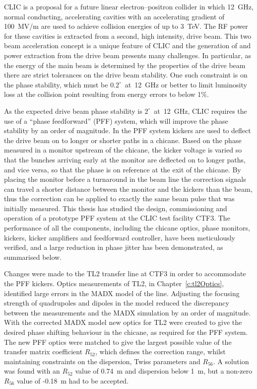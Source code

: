 

CLIC is a proposal for a future linear electron--positron collider in which 12~GHz, normal conducting, accelerating cavities with an accelerating gradient of 100~MV/m are used to achieve collision energies of up to 3~TeV. The RF power for these cavities is extracted from a second, high intensity, drive beam. This two beam acceleration concept is a unique feature of CLIC and the generation of and power extraction from the drive beam presents many challenges. In particular, as the energy of the main beam is determined by the properties of the drive beam there are strict tolerances on the drive beam stability. One such constraint is on the phase stability, which must be \(0.2^\circ\)~at~12~GHz or better to limit luminosity loss at the collision point resulting from energy errors to below 1\%. 

As the expected drive beam phase stability is \(2^\circ\)~at~12~GHz, CLIC requires the use of a ``phase feedforward'' (PFF) system, which will improve the phase stability by an order of magnitude. In the PFF system kickers are used to deflect the drive beam on to longer or shorter paths in a chicane. Based on the phase measured in a monitor upstream of the chicane, the kicker voltage is varied so that the bunches arriving early at the monitor are deflected on to longer paths, and vice versa, so that the phase is on reference at the exit of the chicane. By placing the monitor before a turnaround in the beam line the correction signals can travel a shorter distance between the monitor and the kickers than the beam, thus the correction can be applied to exactly the same beam pulse that was initially measured. This thesis has studied the design, commissioning and operation of a prototype PFF system at the CLIC test facility CTF3. The performance of all the components, including the chicane optics, phase monitors, kickers, kicker amplifiers and feedforward controller, have been meticulously verified, and a large reduction in phase jitter has been demonstrated, as summarised below.

Changes were made to the TL2 transfer line at CTF3 in order to accommodate the PFF kickers. Optics measurements of TL2, in Chapter~\ref{c:tl2Optics},  identified large errors in the MADX model of the line. Adjusting the focusing strength of quadrupoles and dipoles in the model reduced the discrepancy between the measurements and the MADX simulation by an order of magnitude. With the corrected MADX model new optics for TL2  were created to give the desired phase shifting behaviour in the chicane, as required for the PFF system. The new PFF optics were matched to give the largest possible value of the transfer matrix coefficient \(R_{52}\), which defines the correction range, whilst maintaining constraints on the dispersion, Twiss parameters and \(R_{56}\). A solution was found with an \(R_{52}\) value of 0.74~m and dispersion below 1~m, but a non-zero \(R_{56}\) value of -0.18~m had to be accepted.

